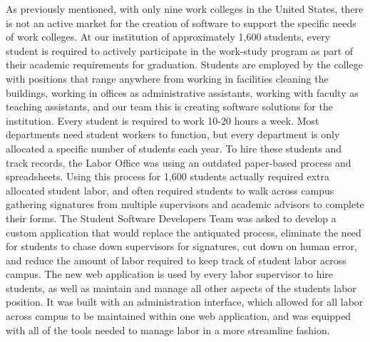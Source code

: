As previously mentioned, with only nine work colleges in the United States, there is not an active market for the creation of software to support the specific needs of work colleges. At our institution of approximately 1,600 students, every student is required to actively participate in the work-study program as part of their academic requirements for graduation. Students are employed by the college with positions that range anywhere from working in facilities cleaning the buildings, working in offices as administrative assistants, working with faculty as teaching assistants, and our team this is creating software solutions for the institution. Every student is required to work 10-20 hours a week. Most departments need student workers to function, but every department is only allocated a specific number of students each year. To hire these students and track records, the Labor Office was using an outdated paper-based process and spreadsheets. Using this process for 1,600 students actually required extra allocated student labor, and often required students to walk across campus gathering signatures from multiple supervisors and academic advisors to complete their forms. The Student Software Developers Team was asked to develop a custom application that would replace the antiquated process, eliminate the need for students to chase down supervisors for signatures, cut down on human error, and reduce the amount of labor required to keep track of student labor across campus. The new web application is used by every labor supervisor to hire students, as well as maintain and manage all other aspects of the students labor position. It was built with an administration interface, which allowed for all labor across campus to be maintained within one web application, and was equipped with all of the tools needed to manage labor in a more streamline fashion.

